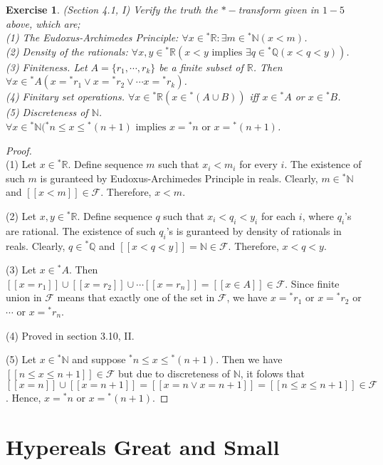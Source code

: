 \documentclass[a4paper, 11pt]{book}
\theoremstyle{plain}
\newtheorem{exercise}{Exercise}[chapter]
\theoremstyle{plain}
\newcommand{\mc}{\mathcal}
\newcommand{\N}{\mathbb{N}}
\newcommand{\Q}{\mathbb{Q}}
\newcommand{\R}{\mathbb{R}}
\newcommand{\hyp}{{}^*}
\begin{document}
  \begin{exercise}
    (Section 4.1, I)
    Verify the truth the $*-$transform given in $1-5$ above, which are; \\
    (1) The Eudoxus-Archimedes Principle: $\forall x \in \hyp \R: \exists m \in \hyp \N (x<m)$.  \\
    (2) Density of the rationals: $\forall x, y \in \hyp \R (x<y \text{ implies } \exists q \in \hyp \Q (x<q<y))$. \\
    (3) Finiteness. Let $A=\{r_1,\cdots, r_k\}$ be a finite subset of $\R$. Then $\forall x \in \hyp A (x=\hyp r_1 \lor x=\hyp r_2 \lor \cdots x=\hyp r_k)$. \\
    (4) Finitary set operations. $\forall x \in \hyp \R (x \in \hyp (A \cup B))$ iff $x \in \hyp A$ or $x \in \hyp B$. \\
    (5) Discreteness of $\N$.  $\forall x \in \hyp \N (\hyp n \leq x \leq \hyp (n+1) \text{ implies } x= \hyp n \text{ or } x=\hyp (n+1)$.
  \end{exercise}
  \begin{proof} $ $ \\

    (1) Let $x \in \hyp \R$. Define sequence $m$ such that $x_i<m_i$ for every $i$. The existence of such $m$ is guranteed by Eudoxus-Archimedes Principle in reals. Clearly, $m \in \hyp \N$ and $[[x<m]] \in \mc{F}$. Therefore, $x<m$. 

    (2) Let $x,y \in \hyp \R$. Define sequence $q$ such that $x_i<q_i<y_i$ for each $i$, where $q_i$'s are rational. The existence of such $q_i$'s is guranteed by density of rationals in reals. Clearly, $q \in \hyp \Q$ and $[[x<q<y]]=\N \in \mc{F}$. Therefore, $x<q<y$. 

    (3) Let $x \in \hyp A$. Then $[[x=r_1]] \cup [[x=r_2]]\cup \cdots [[x=r_n]]=[[x \in A]] \in \mc{F}$. Since finite union in $\mc{F}$ means that exactly one of the set in $\mc{F}$, we have $x=\hyp r_1$ or $x=\hyp r_2$ or $\cdots$ or $x=\hyp r_n$.

    (4) Proved in section 3.10, II.

    (5) Let $x \in \hyp \N$ and suppose $\hyp n \leq x \leq \hyp (n+1)$. Then we have $[[n \leq x \leq n+1]] \in \mc{F}$ but due to discreteness of $\N$, it folows that $[[x=n]] \cup [[x=n+1]]=[[x=n \lor x=n+1]]=[[n \leq x \leq n+1]] \in \mc{F}$. Hence, $x=\hyp n$ or $x=\hyp(n+1)$.
  \end{proof}

\chapter{Hypereals Great and Small}
\end{document}
